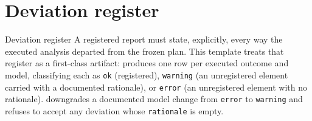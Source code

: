 \documentclass[
  ignorenonframetext,
]{beamer}
\author{\texorpdfstring{}{}}
\date{}
\begin{document}
\section{Deviation register}\label{sec:deviations}

\begin{frame}{Deviation register}
A registered report must state, explicitly, every way the executed
analysis departed from the frozen plan. This template treats that
register as a first-class artifact: 
produces one row per executed outcome and model, classifying each as
\texttt{ok} (registered), \texttt{warning} (an unregistered element
carried with a documented rationale), or \texttt{error} (an unregistered
element with no rationale). 
downgrades a documented model change from \texttt{error} to
\texttt{warning} and refuses to accept any deviation whose
\texttt{rationale} is empty.
\end{frame}
\end{document}
